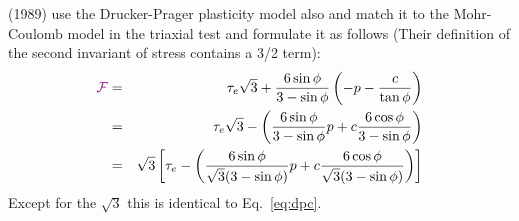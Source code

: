 

\vspace{1.3cm}
\begin{remark}
\textcite{leor89} (1989) use the Drucker-Prager plasticity model also and match it to the Mohr-Coulomb model in the 
triaxial test and formulate it as follows 
(Their definition of the second invariant of stress contains a 3/2 term):
\begin{eqnarray}
{\color{violet}\cal F} 
&=& \tau_e \sqrt{3} + \frac{6 \sin\phi}{3-\sin\phi} \left( -p  - \frac{c}{\tan \phi} \right) \nonumber\\
&=& \tau_e \sqrt{3} - \left( \frac{6 \sin\phi}{3-\sin\phi}  p  + c \frac{6 \cos\phi}{3-\sin\phi} \right) \nonumber\\
&=& \sqrt{3} \left[ \tau_e  - \left( \frac{6 \sin\phi}{\sqrt{3}(3-\sin\phi)}  p  + c \frac{6 \cos\phi}{\sqrt{3}(3-\sin\phi)} \right)  \right]
\end{eqnarray}
Except for the $\sqrt{3}$ this is identical to Eq.~\eqref{eq:dpc}.
\end{remark}

